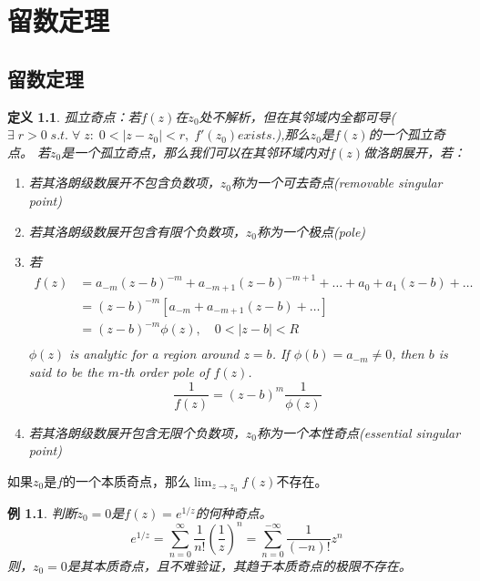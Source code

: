 \documentclass[10pt, a4paper, oneside]{ctexbook}
\newtheorem{definition}[theorem]{定义}
\newtheorem{example}[theorem]{例}
\begin{document}
\chapter{留数定理}
\section{留数定理}
\begin{definition}
    孤立奇点：若$f(z)$在$z_0$处不解析，但在其邻域内全都可导($\exists \; r > 0\; s.t.\; \forall \;z:\; 0<|z-z_0|<r,\; f'(z_0) exists.$),那么$z_0$是$f(z)$的一个孤立奇点。
    若$z_0$是一个孤立奇点，那么我们可以在其邻环域内对$f(z)$做洛朗展开，若：
    \begin{enumerate}
        \item 若其洛朗级数展开不包含负数项，$z_0$称为一个可去奇点(removable singular point)
        \item 若其洛朗级数展开包含有限个负数项，$z_0$称为一个极点(pole)
        \item 若
              \begin{equation*}
                  \begin{aligned}
                      f(z) & =a_{-m}(z-b)^{-m}+a_{-m+1}(z-b)^{-m+1}+\ldots+a_{0}+a_{1}(z-b)+\ldots \\
                           & =(z-b)^{-m}\left[a_{-m}+a_{-m+1}(z-b)+\ldots\right]                   \\
                           & =(z-b)^{-m} \phi(z), \quad 0<|z-b|<R                                  \\
                  \end{aligned}
              \end{equation*}
              $\phi(z)$ is analytic for a region around $z=b$. If $\phi(b)=a_{-m} \neq 0$, then $b$ is said to be the $m$-th order pole of $f(z)$.
              $$
                  \frac{1}{f(z)}=(z-b)^{m} \frac{1}{\phi(z)}
              $$
        \item 若其洛朗级数展开包含无限个负数项，$z_0$称为一个本性奇点(essential singular point)
    \end{enumerate}
\end{definition}
如果$z_0$是$f$的一个本质奇点，那么$\lim_{z\to z_0}f(z)$不存在。
\begin{example}判断$z_0=0$是$f(z)=e^{1/z}$的何种奇点。
    \begin{equation*}
        e^{1/z}= \sum_{n=0}^\infty \frac{1}{n!} \left( \frac{1}{z} \right)^n=\sum_{n=0}^{-\infty} \frac{1}{(-n)!} z^n
    \end{equation*}
    则，$z_0=0$是其本质奇点，且不难验证，其趋于本质奇点的极限不存在。
\end{example}
\end{document}
